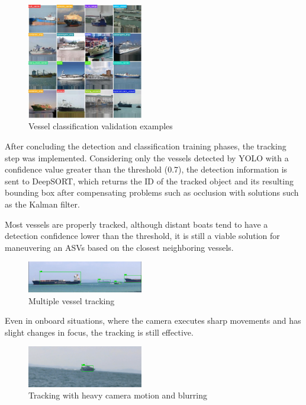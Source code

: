 \documentclass[a4paper,12pt]{article}
\begin{document}
\begin{multicols}{2}
\begin{figure}[H]
    \centering
    \includegraphics[width=0.45\textwidth]{images/classification/validation_labels}
    \caption{Vessel classification validation examples}
    \label{fig:6}
\end{figure}

After concluding the detection and classification training phases, the tracking step was implemented.
Considering only the vessels detected by YOLO with a confidence value greater than the threshold (0.7), the detection information is sent to DeepSORT, which returns the ID of the tracked object and its resulting bounding box after compensating problems such as occlusion with solutions such as the Kalman filter.

Most vessels are properly tracked, although distant boats tend to have a detection confidence lower than the threshold, it is still a viable solution for maneuvering an ASVs based on the closest neighboring vessels.

\begin{figure}[H]
    \centering
    \includegraphics[width=0.45\textwidth]{images/tracking/detected_ships}
    \caption{Multiple vessel tracking}
    \label{fig:7}
\end{figure}

Even in onboard situations, where the camera executes sharp movements and has slight changes in focus, the tracking is still effective.

\begin{figure}[H]
    \centering
    \includegraphics[width=0.45\textwidth]{images/tracking/blurred_ship}
    \caption{Tracking with heavy camera motion and blurring}
    \label{fig:8}
\end{figure}


\end{multicols}
\end{document}
